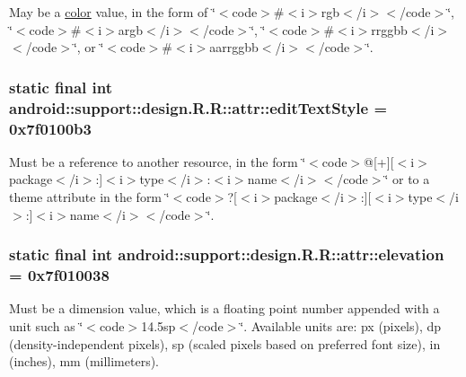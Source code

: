May be a \hyperlink{classandroid_1_1support_1_1design_1_1_r_1_1color}{color} value, in the form of \char`\"{}$<$code$>$\#$<$i$>$rgb$<$/i$>$$<$/code$>$\char`\"{}, \char`\"{}$<$code$>$\#$<$i$>$argb$<$/i$>$$<$/code$>$\char`\"{}, \char`\"{}$<$code$>$\#$<$i$>$rrggbb$<$/i$>$$<$/code$>$\char`\"{}, or \char`\"{}$<$code$>$\#$<$i$>$aarrggbb$<$/i$>$$<$/code$>$\char`\"{}. \hypertarget{classandroid_1_1support_1_1design_1_1_r_1_1attr_a2b655365c0512756f0b689cc7aef842}{
\subsubsection[{editTextStyle}]{\setlength{\rightskip}{0pt plus 5cm}static final int android::support::design.R.R::attr::editTextStyle = 0x7f0100b3}}
\label{classandroid_1_1support_1_1design_1_1_r_1_1attr_a2b655365c0512756f0b689cc7aef842}


Must be a reference to another resource, in the form \char`\"{}$<$code$>$@\mbox{[}+\mbox{]}\mbox{[}$<$i$>$package$<$/i$>$:\mbox{]}$<$i$>$type$<$/i$>$:$<$i$>$name$<$/i$>$$<$/code$>$\char`\"{} or to a theme attribute in the form \char`\"{}$<$code$>$?\mbox{[}$<$i$>$package$<$/i$>$:\mbox{]}\mbox{[}$<$i$>$type$<$/i$>$:\mbox{]}$<$i$>$name$<$/i$>$$<$/code$>$\char`\"{}. \hypertarget{classandroid_1_1support_1_1design_1_1_r_1_1attr_57192c6eb765e275a3c71779037359e5}{
\subsubsection[{elevation}]{\setlength{\rightskip}{0pt plus 5cm}static final int android::support::design.R.R::attr::elevation = 0x7f010038}}
\label{classandroid_1_1support_1_1design_1_1_r_1_1attr_57192c6eb765e275a3c71779037359e5}


Must be a dimension value, which is a floating point number appended with a unit such as \char`\"{}$<$code$>$14.5sp$<$/code$>$\char`\"{}. Available units are: px (pixels), dp (density-independent pixels), sp (scaled pixels based on preferred font size), in (inches), mm (millimeters). 

